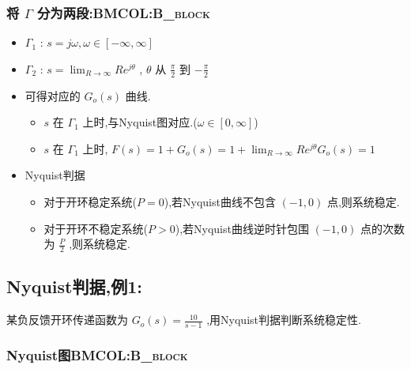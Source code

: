 \documentclass[table]{article}
\begin{document}
\subsubsection[将 \(\Gamma\) 分为两段:]{将 \(\Gamma\) 分为两段:\hfill{}\textsc{BMCOL:B\_block}}
\label{sec:org3060a3d}
\begin{itemize}
\item \(\Gamma_1\) : \(s=j\omega,\omega\in[-\infty,\infty]\)
\item \(\Gamma_2\) : \(s=\lim_{R\rightarrow\infty}Re^{j\theta}\) , \(\theta\) 从 \(\frac{\pi}{2}\) 到 \(-\frac{\pi}{2}\)
\item 可得对应的 \(G_o(s)\) 曲线.
\begin{itemize}
\item \(s\) 在 \(\Gamma_1\) 上时,与Nyquist图对应.(\(\omega\in[0,\infty]\))
\item \(s\) 在 \(\Gamma_1\) 上时, \(F(s)=1+G_o(s)=1+\lim_{R\rightarrow\infty}Re^{j\theta}G_o(s)=1\)
\end{itemize}
\item <3-> Nyquist判据
\begin{itemize}
\item 对于开环稳定系统(\(P=0\)),若Nyquist曲线不包含 \((-1,0)\) 点,则系统稳定.
\item 对于开环不稳定系统(\(P>0\)),若Nyquist曲线逆时针包围 \((-1,0)\) 点的次数为 \(\frac{P}{2}\) ,则系统稳定.
\end{itemize}
\end{itemize}

\subsection{Nyquist判据,例1:}
\label{sec:org083180e}
某负反馈开环传递函数为 \(G_o(s)=\frac{10}{s-1}\) ,用Nyquist判据判断系统稳定性.

\subsubsection[Nyquist图]{Nyquist图\hfill{}\textsc{BMCOL:B\_block}}
\label{sec:org25f467f}
\end{document}
